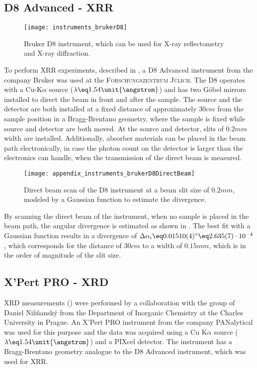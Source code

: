 \documentclass[\main/dresen_thesis.tex]{subfiles}
\begin{document}
  \subsection{D8 Advanced - XRR}
    \label{ch:instruments:laboratoryInstruments:xrr}
    \begin{figure}[ht]
      \centering
      \texttt{[image: instruments\_brukerD8]}
      \caption{\label{fig:appendix:instruments:brukerD8}Bruker D8 instrument, which can be used for X-ray reflectometry and X-ray diffraction.}
    \end{figure}
    To perform XRR experiments, described in , a D8 Advanced instrument from the company Bruker was used at the \textsc{Forschungszentrum J\"ulich}.
    The D8 operates with a Cu-K$\alpha$ source ($\lambda \eq 1.54 \unit{\angstrom}$) and has two G\"obel mirrors installed to direct the beam in front and after the sample.
    The source and the detector are both installed at a fixed distance of approximately $30 \unit{cm}$ from the sample position in a Bragg-Brentano geometry, where the sample is fixed while source and detector are both moved.
    At the source and detector, slits of $0.2 \unit{mm}$ width are installed.
    Additionally, absorber materials can be placed in the beam path electronically, in case the photon count on the detector is larger than the electronics can handle, \eg when the transmission of the direct beam is measured.

    \begin{figure}[ht]
      \centering
      \texttt{[image: appendix\_instruments\_brukerD8DirectBeam]}
      \caption{\label{fig:appendix:instruments:brukerD8DirectBeam}Direct beam scan of the D8 instrument at a beam slit size of $0.2 \unit{mm}$, modeled by a Gaussian function to estimate the divergence.}
    \end{figure}

    By scanning the direct beam of the instrument, when no sample is placed in the beam path, the angular divergence is estimated as shown in .
    The best fit with a Gaussian function results in a divergence of $\Delta \alpha_i \eq 0.01510(4) ^\circ \eq 2.635(7) \cdot 10^{-4}$, which corresponds for the distance of $30 \unit{cm}$ to a width of $0.15 \unit{mm}$, which is in the order of magnitude of the slit size.


  \subsection{X'Pert PRO - XRD}
    \label{ch:instruments:laboratoryInstruments:xrd}
    XRD measurements () were performed by a collaboration with the group of Daniel Nižňanský from the Department of Inorganic Chemistry at the Charles University in Prague.
    An X'Pert PRO instrument from the company PANalytical was used for this purpose and the data was acquired using a Cu K$\alpha$ source ($\lambda \eq 1.54 \unit{\angstrom}$) and a PIXcel detector.
    The instrument has a Bragg-Brentano geometry analogue to the D8 Advanced instrument, which was used for XRR.
\end{document}

